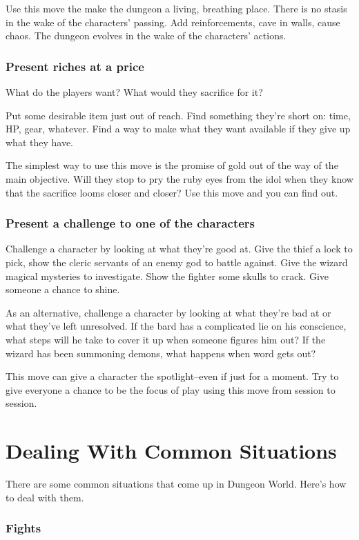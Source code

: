 Use this move the make the dungeon a living, breathing place. There is no stasis in the wake of the characters' passing. Add reinforcements, cave in walls, cause chaos. The dungeon evolves in the wake of the characters' actions.
\subsubsection{Present riches at a price}

What do the players want? What would they sacrifice for it?

Put some desirable item just out of reach. Find something they're short on: time, HP, gear, whatever. Find a way to make what they want available if they give up what they have.

The simplest way to use this move is the promise of gold out of the way of the main objective. Will they stop to pry the ruby eyes from the idol when they know that the sacrifice looms closer and closer? Use this move and you can find out.
\subsubsection{Present a challenge to one of the characters}

Challenge a character by looking at what they're good at. Give the thief a lock to pick, show the cleric servants of an enemy god to battle against. Give the wizard magical mysteries to investigate. Show the fighter some skulls to crack. Give someone a chance to shine.

As an alternative, challenge a character by looking at what they're bad at or what they've left unresolved. If the bard has a complicated lie on his conscience, what steps will he take to cover it up when someone figures him out? If the wizard has been summoning demons, what happens when word gets out?

 This move can give a character the spotlight--even if just for a moment. Try to give everyone a chance to be the focus of play using this move from session to session.

\section*{Dealing With Common Situations}

There are some common situations that come up in Dungeon World. Here's how to deal with them.
\subsubsection{Fights}

